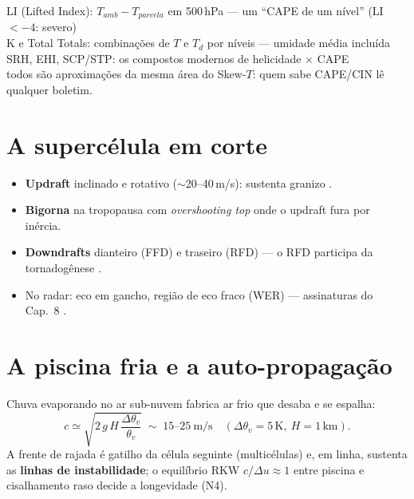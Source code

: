 \documentclass[11pt]{article}
\begin{document}
\begin{noquadro}
LI (Lifted Index): $T_{amb} - T_{parcela}$ em 500\,hPa — um ``CAPE de
um nível'' (LI $< -4$: severo)\\
K e Total Totals: combinações de $T$ e $T_d$ por níveis — umidade
média incluída\\
SRH, EHI, SCP/STP: os compostos modernos de helicidade $\times$ CAPE\\[2pt]
todos são aproximações da mesma área do Skew-$T$: quem sabe CAPE/CIN
lê qualquer boletim.
\end{noquadro}

\section{A supercélula em corte}\label{sec:super}

\begin{itemize}
  \item \textbf{Updraft} inclinado e rotativo ($\sim$20--40\,m/s):
        sustenta granizo .
  \item \textbf{Bigorna} na tropopausa  com
        \emph{overshooting top} onde o updraft fura por inércia.
  \item \textbf{Downdrafts} dianteiro (FFD) e traseiro (RFD) — o RFD
        participa da tornadogênese .
  \item No radar: eco em gancho, região de eco fraco (WER) —
        assinaturas do Cap.~8 .
\end{itemize}

\section{A piscina fria e a auto-propagação}\label{sec:piscina}


\begin{formadif}
Chuva evaporando no ar sub-nuvem  fabrica ar
frio que desaba e se espalha:
\[ c \simeq \sqrt{2\,g\,H\,\frac{\Delta\theta_v}{\theta_v}}
\;\sim\; 15\text{--}25\ \mathrm{m/s}
\quad(\Delta\theta_v = 5\,\mathrm{K},\ H = 1\,\mathrm{km}). \]
A frente de rajada é gatilho da célula seguinte (multicélulas) e, em
linha, sustenta as \textbf{linhas de instabilidade}; o equilíbrio
RKW $c/\Delta u \approx 1$ entre piscina e cisalhamento raso decide a
longevidade (N4).
\end{formadif}
\end{document}
